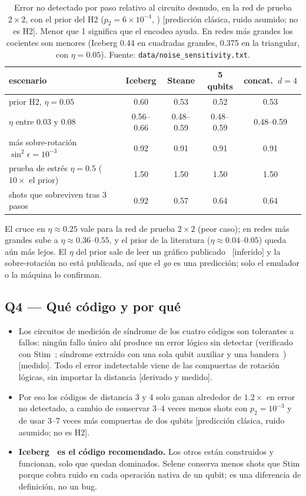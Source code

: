 \documentclass[11pt,a4paper]{article}
\newcommand{\code}[1]{\nolinkurl{#1}}
\newcommand{\pred}{\textsf{\small[predicci\'on cl\'asica, ruido asumido; no es H2]}}
\begin{document}
\begin{table}[h]\centering\small
\caption{Error no detectado por paso relativo al circuito desnudo, en la red de prueba $2\times2$,
con el prior del H2 ($p_2=6\times10^{-4}$, \cite{moses2023,haghshenas2026}) \pred. Menor que 1 significa que el encodeo ayuda. En
redes m\'as grandes los cocientes son menores (Iceberg 0.44 en cuadradas grandes, 0.375 en la
triangular, con $\eta=0.05$). Fuente: \code{data/noise\_sensitivity.txt}.}
\begin{tabular}{lcccc}
\toprule
escenario & Iceberg & Steane & 5 qubits & concat.\ $d=4$\\
\midrule
prior H2, $\eta=0.05$ & $\mathbf{0.60}$ & 0.53 & 0.52 & 0.53\\
$\eta$ entre 0.03 y 0.08 & 0.56--0.66 & 0.48--0.59 & 0.48--0.59 & 0.48--0.59\\
m\'as sobre-rotaci\'on $\sin^2\epsilon=10^{-3}$ & 0.92 & 0.91 & 0.91 & 0.91\\
prueba de estr\'es $\eta=0.5$ ($10\times$ el prior) & 1.50 & 1.50 & 1.50 & 1.50\\
\midrule
shots que sobreviven tras 3 pasos & 0.92 & 0.57 & 0.64 & 0.64\\
\bottomrule
\end{tabular}
\end{table}
\noindent El cruce en $\eta\approx0.25$ vale para la red de prueba $2\times2$ (peor caso); en redes m\'as grandes
sube a $\eta\approx0.36$--$0.55$, y el prior de la literatura ($\eta\approx0.04$--$0.05$) queda a\'un m\'as lejos.
El $\eta$ del prior sale de leer un gr\'afico publicado~\cite{haghshenas2026} [inferido] y la sobre-rotaci\'on no est\'a publicada,
as\'i que el \emph{go} es una predicci\'on; solo el emulador o la m\'aquina lo confirman.

\subsection{Q4 --- Qu\'e c\'odigo y por qu\'e}
\begin{itemize}[leftmargin=1.4em]
  \item Los circuitos de medici\'on de s\'indrome de los cuatro c\'odigos son tolerantes a fallos: ning\'un
    fallo \'unico ah\'i produce un error l\'ogico sin detectar (verificado con Stim~\cite{gidney2021}; s\'indrome extra\'ido con una sola qubit auxiliar y una bandera~\cite{chao2018}) [medido]. Todo el error indetectable viene
    de las compuertas de rotaci\'on l\'ogicas, sin importar la distancia [derivado y medido].
  \item Por eso los c\'odigos de distancia 3 y 4 solo ganan alrededor de $1.2\times$ en error no
    detectado, a cambio de conservar 3--4 veces menos shots con $p_2=10^{-3}$ y de usar 3--7 veces m\'as
    compuertas de dos qubits \pred.
  \item \textbf{Iceberg~\cite{self2024} es el c\'odigo recomendado.} Los otros est\'an construidos y funcionan, solo que
    quedan dominados. Selene conserva menos shots que Stim porque cobra ruido en cada operaci\'on nativa de
    un qubit; es una diferencia de definici\'on, no un bug.
\end{itemize}
\end{document}

